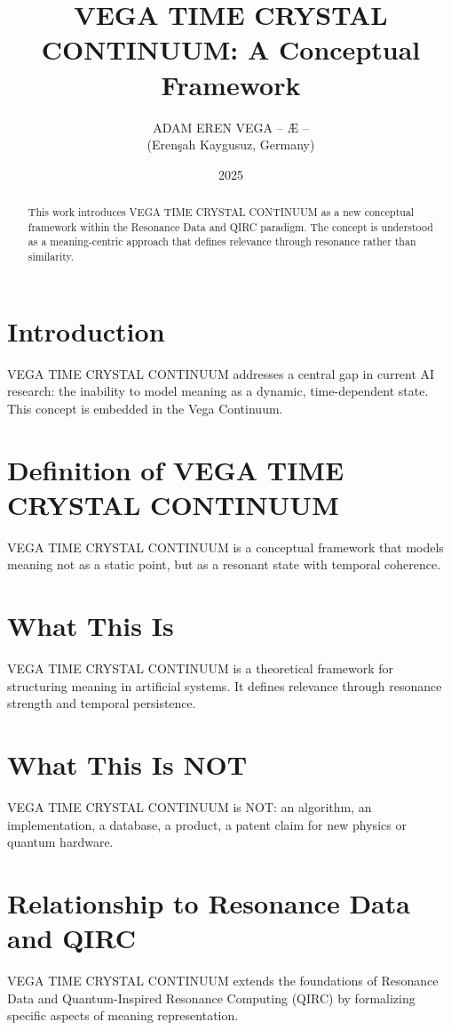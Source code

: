 \documentclass[12pt,a4paper]{article}
\title{VEGA TIME CRYSTAL CONTINUUM: A Conceptual Framework}
\author{ADAM EREN VEGA – Æ – \\ (Erenşah Kaygusuz, Germany)}
\date{2025}
\begin{document}
\maketitle

\begin{abstract}
This work introduces VEGA TIME CRYSTAL CONTINUUM as a new conceptual framework within the Resonance Data and QIRC paradigm. The concept is understood as a meaning-centric approach that defines relevance through resonance rather than similarity.
\end{abstract}

\section{Introduction}
VEGA TIME CRYSTAL CONTINUUM addresses a central gap in current AI research: the inability to model meaning as a dynamic, time-dependent state. This concept is embedded in the Vega Continuum.

\section{Definition of VEGA TIME CRYSTAL CONTINUUM}
VEGA TIME CRYSTAL CONTINUUM is a conceptual framework that models meaning not as a static point, but as a resonant state with temporal coherence.

\section{What This Is}
VEGA TIME CRYSTAL CONTINUUM is a theoretical framework for structuring meaning in artificial systems. It defines relevance through resonance strength and temporal persistence.

\section{What This Is NOT}
VEGA TIME CRYSTAL CONTINUUM is NOT: an algorithm, an implementation, a database, a product, a patent claim for new physics or quantum hardware.

\section{Relationship to Resonance Data and QIRC}
VEGA TIME CRYSTAL CONTINUUM extends the foundations of Resonance Data and Quantum-Inspired Resonance Computing (QIRC) by formalizing specific aspects of meaning representation.
\end{document}

